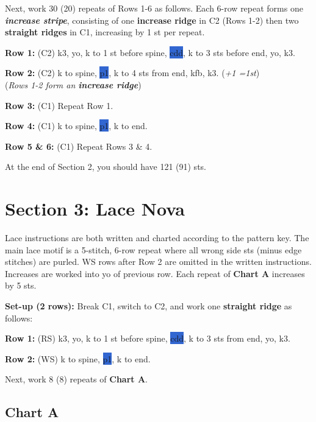 \documentclass[12pt]{article}
\newcommand{\vocab}[1]{\emph{\textbf{#1}}} %
\newcommand{\rowDir}[1]{\hspace{-2em} \textbf{#1:}} %
\newcommand{\spine}[1]{\colorbox{highlight}{#1}} %
\newcommand{\increase}[1]{(\emph{+#1 
	\ifnum#1=1{st}\else{sts}\fi})}
\newenvironment{frdirection}
    {%
	\def\FrameCommand{\fboxrule=\FrameRule\fboxsep=\FrameSep \fbox}
   	\MakeFramed {\advance\hsize-\width \FrameRestore}
    	\addmargin[1.5cm]{0pt}}
    {\endaddmargin
	\endMakeFramed}
\newenvironment{unframed}
    {%
	\begin{addmargin}[1.5cm]{0pt}}
    {\vspace{1em}
	\end{addmargin}}
\begin{document}
Next, work 30 (20) repeats of Rows 1-6 as follows. Each 6-row repeat forms one \vocab{increase stripe}, consisting of one \textbf{increase ridge} in C2 (Rows 1-2) then two \textbf{straight ridges} in C1, increasing by 1 st per repeat. 

\begin{frdirection}
\rowDir{Row 1} (C2) k3, yo, k to 1 st before spine, \spine{cdd}, k to 3 sts before end, yo, k3.

\rowDir{Row 2} (C2) k to spine, \spine{p1}, k to 4 sts from end, kfb, k3. \increase{1}
\\ (\emph{Rows 1-2 form an \textbf{increase ridge}})

\rowDir{Row 3} (C1) Repeat Row 1.

\rowDir{Row 4} (C1) k to spine, \spine{p1}, k to end.

\rowDir{Row 5 \& 6} (C1) Repeat Rows 3 \& 4.
\end{frdirection}

At the end of Section 2, you should have 121 (91) sts. 

\newpage
\section*{Section 3: Lace Nova}
Lace instructions are both written and charted according to the pattern key. The main lace motif is a 5-stitch, 6-row repeat where all wrong side sts (minus edge stitches) are purled. WS rows after Row 2 are omitted in the written instructions. Increases are worked into yo of previous row. Each repeat of \textbf{Chart A} increases by 5 sts.
\vspace{1em}
\begin{unframed} \rowDir{Set-up (2 rows)} Break C1, switch to C2, and work one \textbf{straight ridge} as follows: \end{unframed}
\vspace{-2em}
\begin{frdirection}
\rowDir{Row 1} (RS) k3, yo, k to 1 st before spine, \spine{cdd},  k to 3 sts from end, yo, k3.

\rowDir{Row 2} (WS) k to spine, \spine{p1}, k to end.
\end{frdirection}

Next, work 8 (8) repeats of \textbf{Chart A}. \vspace{-1em}

\subsection*{Chart A}
\end{document}
